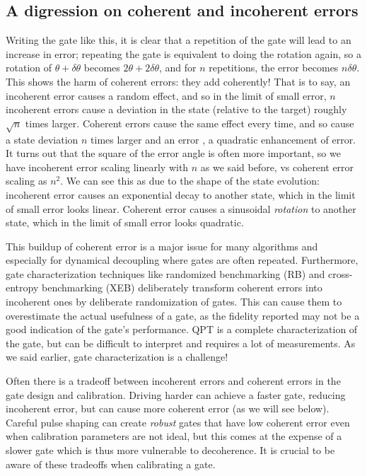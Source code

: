 \subsection{A digression on coherent and incoherent errors}
Writing the gate like this, it is clear that a repetition of the gate will lead to an increase in error; repeating the gate is equivalent to doing the rotation again, so a rotation of $\theta + \delta \theta$ becomes $2 \theta + 2\delta\theta$, and for $n$ repetitions, the error becomes $n \delta \theta$.
This shows the harm of coherent errors: they add coherently!
That is to say, an incoherent error causes a random effect, and so in the limit of small error, $n$ incoherent errors cause a deviation in the state (relative to the target) roughly $\sqrt{n}$ times larger. 
Coherent errors cause the same effect every time, and so cause a state deviation $n$ times larger and an error , a quadratic enhancement of error.
It turns out that the square of the error angle is often more important, so we have incoherent error scaling linearly with $n$ as we said before, vs coherent error scaling as $n^2$.
We can see this as due to the shape of the state evolution: incoherent error causes an exponential decay to another state, which in the limit of small error looks linear.
Coherent error causes a sinusoidal \textit{rotation} to another state, which in the limit of small error looks quadratic.

This buildup of coherent error is a major issue for many algorithms and especially for dynamical decoupling where gates are often repeated. Furthermore, gate characterization techniques like randomized benchmarking (RB) and cross-entropy benchmarking (XEB) deliberately transform coherent errors into incoherent ones by deliberate randomization of gates. This can cause them to overestimate the actual usefulness of a gate, as the fidelity reported may not be a good indication of the gate's performance. QPT is a complete characterization of the gate, but can be difficult to interpret and requires a lot of measurements. As we said earlier, gate characterization is a challenge!

Often there is a tradeoff between incoherent errors and coherent errors in the gate design and calibration. Driving harder can achieve a faster gate, reducing incoherent error, but can cause more coherent error (as we will see below). Careful pulse shaping can create \textit{robust} gates that have low coherent error even when calibration parameters are not ideal, but this comes at the expense of a slower gate which is thus more vulnerable to decoherence. It is crucial to be aware of these tradeoffs when calibrating a gate.

